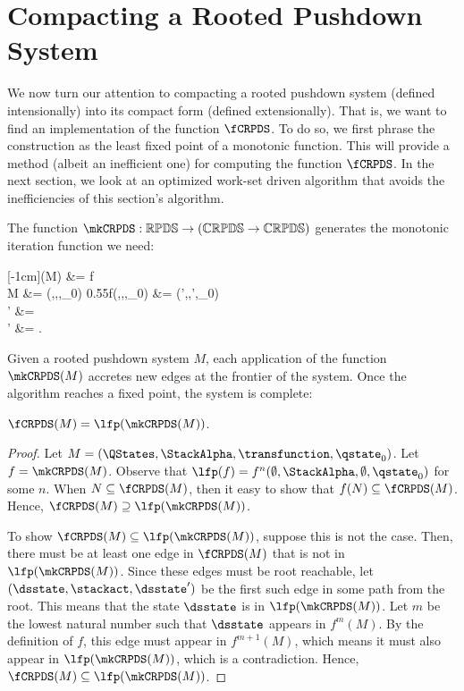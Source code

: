 \section{Compacting a Rooted Pushdown System}
\label{sec:rpds-to-crpds}
We now turn our attention to compacting a rooted pushdown
system (defined intensionally) into its compact form (defined
extensionally).
That is, we want to find an implementation of the function $\fCRPDS$.
To do so, we first phrase the construction as the least fixed point of a monotonic function.
This will provide a method (albeit an inefficient one) for computing
the function $\fCRPDS$.
In the next section, we look at an optimized work-set driven
algorithm that avoids the inefficiencies of this section's algorithm.



The function $\mkCRPDS : \mathbb{RPDS} \to (\mathbb{CRPDS} \to
\mathbb{CRPDS})$ generates the monotonic iteration function we need:
\begin{center}
  [-1cm]{\mkCRPDS(M) &= f
    \\
    M &= (\QStates,\StackAlpha,\transfunction,\qstate_0)}
    {0.55}{f(\DSStates,\DSFrames,\DSEdges,\dsstate_0) &=
    (\DSStates',\DSFrames,\DSEdges',\dsstate_0) 
    \\
    \DSStates' &= \DSStates \union {} \union {}
    \\
    \DSEdges' &= \DSEdges \union {} \text.
}
\end{center}
Given a rooted pushdown system $M$, each application of the function
$\mkCRPDS(M)$ accretes new edges at the frontier of the system.
Once the algorithm reaches a fixed point, the system is complete:
\begin{theorem}\label{thm:mkCRPDS-correct}
  $\fCRPDS(M) = \lfp(\mkCRPDS(M))$.
\end{theorem}
\begin{proof}
Let $M = (\QStates,\StackAlpha,\transfunction,\qstate_0)$.
Let $f = \mkCRPDS(M)$.
Observe that $\lfp(f) = f^n(\emptyset,\StackAlpha,\emptyset,\qstate_0)$ for some $n$.
When $N \subseteq \fCRPDS(M)$, then it easy to show that $f(N) \subseteq \fCRPDS(M)$.
Hence, $\fCRPDS(M) \supseteq \lfp(\mkCRPDS(M))$.

  To show $\fCRPDS(M) \subseteq \lfp(\mkCRPDS(M))$, suppose this is not
  the case.
Then, there must be at least one edge in $\fCRPDS(M)$ that is not in
  $\lfp(\mkCRPDS(M))$.
Since these edges must be root reachable, let $(\dsstate,\stackact,\dsstate')$ be the first such edge in some path from the root.
This means that the state $\dsstate$ is in $\lfp(\mkCRPDS(M))$.
Let $m$ be the lowest natural number such that $\dsstate$ appears in $f^m(M)$.
By the definition of $f$, this edge must appear in $f^{m+1}(M)$, which means it must also appear in 
  $\lfp(\mkCRPDS(M))$, which is a contradiction.
Hence, $\fCRPDS(M) \subseteq \lfp(\mkCRPDS(M))$.
\end{proof}

